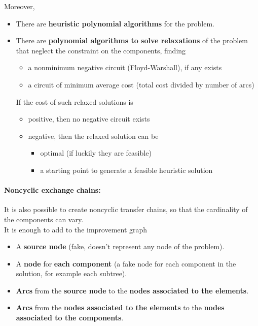 Moreover,
\begin{itemize}
	\item There are \textbf{heuristic polynomial algorithms} for the problem.\\
	
	\item There are \textbf{polynomial algorithms to solve relaxations} of the problem that neglect the constraint on the components, finding
	\begin{itemize}
		\item a nonminimum negative circuit (Floyd-Warshall), if any exists
		
		\item a circuit of minimum average cost (total cost divided by number of arcs)
	\end{itemize}
	If the cost of such relaxed solutions is
	\begin{itemize}
		\item positive, then no negative circuit exists
		
		\item negative, then the relaxed solution can be
		\begin{itemize}
			\item optimal (if luckily they are feasible)
			\item a starting point to generate a feasible heuristic solution
		\end{itemize}
	\end{itemize}
\end{itemize}

\newpage

\paragraph{Noncyclic exchange chains:} It is also possible to create noncyclic transfer chains, so that the cardinality of the components can vary.\\

It is enough to add to the improvement graph
\begin{itemize}
	\item A \textbf{source node} (fake, doesn't represent any node of the problem).\\
	
	\item A \textbf{node} for \textbf{each component} (a fake node for each component in the solution, for example each subtree).\\
	
	\item \textbf{Arcs} from the \textbf{source node} to the \textbf{nodes associated to the elements}.\\
	
	\item \textbf{Arcs} from the \textbf{nodes associated to the elements} to the \textbf{nodes associated to the components}.\\
\end{itemize}

